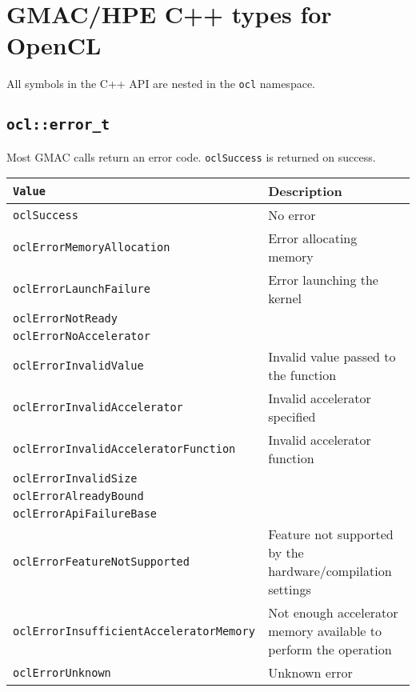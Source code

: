 \section{GMAC\slash HPE C++ types for OpenCL}

All symbols in the C++ API are nested in the \texttt{ocl} namespace.

\subsection{\texttt{ocl::error\_t}}

Most GMAC calls return an error code. \texttt{oclSuccess} is returned on success.
\vspace{11pt}\\
\begin{tabularx}{\linewidth}{|>{\texttt\bgroup}l<{\egroup}|X|}
  \hline
  \textnormal{Value} & Description \\
  \hline
  \hline
  oclSuccess                            & No error                             \\
  oclErrorMemoryAllocation              & Error allocating memory              \\
  oclErrorLaunchFailure                 & Error launching the kernel           \\
  oclErrorNotReady                      &                                      \\
  oclErrorNoAccelerator                 &                                      \\
  oclErrorInvalidValue                  & Invalid value passed to the function \\
  oclErrorInvalidAccelerator            & Invalid accelerator specified        \\
  oclErrorInvalidAcceleratorFunction    & Invalid accelerator function         \\
  oclErrorInvalidSize                   &                                      \\
  oclErrorAlreadyBound                  &                                      \\
  oclErrorApiFailureBase                &                                      \\
  oclErrorFeatureNotSupported           & Feature not supported by the hardware\slash{}compilation
                                          settings                             \\
  oclErrorInsufficientAcceleratorMemory & Not enough accelerator memory available to perform the 
                                          operation                            \\
  oclErrorUnknown                       & Unknown error                        \\
  \hline
\end{tabularx}

